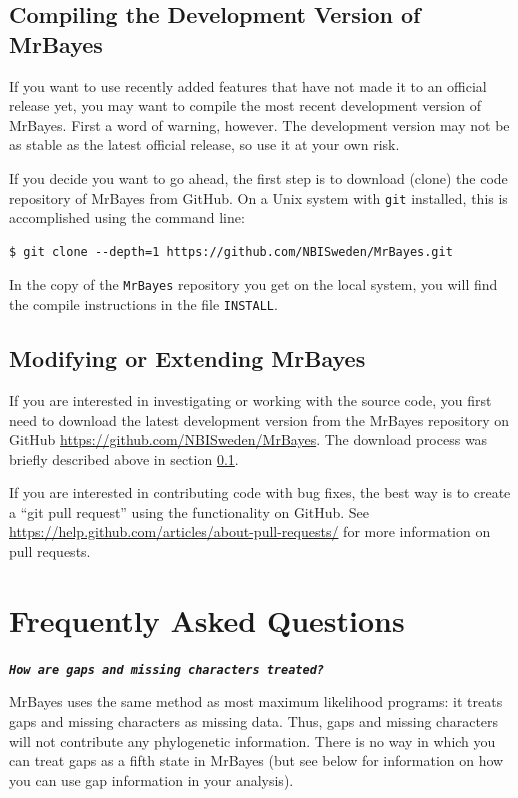 \documentclass[12pt]{book}
\newcommand{\ttt}[1]{\texttt{#1}}
\newcommand{\tb}[1]{\ttt{\textbf{#1}}}
\begin{document}
\subsection{Compiling the Development Version of MrBayes}
\label{compileDevVersion}

If you want to use recently added features that have not made it to an official release yet, you
may want to compile the most recent development version of MrBayes. First a word of warning,
however. The development version may not be as stable as the latest official release, so use it at
your own risk.

If you decide you want to go ahead, the first step is to download (clone) the code repository of
MrBayes from GitHub. On a Unix system with \ttt{git} installed, this is accomplished using the
command line:

\begin{verbatim}
$ git clone --depth=1 https://github.com/NBISweden/MrBayes.git
\end{verbatim}

In the copy of the \ttt{MrBayes} repository you get on the local system, you will find the compile
instructions in the file \ttt{INSTALL}.

\subsection{Modifying or Extending MrBayes}

If you are interested in investigating or working with the source code, you first need to download
the latest development version from the MrBayes repository on GitHub
\url{https://github.com/NBISweden/MrBayes}. The download process was briefly described above in
section \ref{compileDevVersion}.

If you are interested in contributing code with bug fixes, the best way is to create a ``git pull
request'' using the functionality on GitHub. See
\url{https://help.github.com/articles/about-pull-requests/} for more information on pull requests.


\section{Frequently Asked Questions}
\label{FAQ}

\tb{\it{How are gaps and missing characters treated?}}

MrBayes uses the same method as most maximum likelihood programs: it treats gaps and missing
characters as missing data. Thus, gaps and missing characters will not contribute any phylogenetic
information. There is no way in which you can treat gaps as a fifth state in MrBayes (but see below
for information on how you can use gap information in your analysis).
\end{document}
